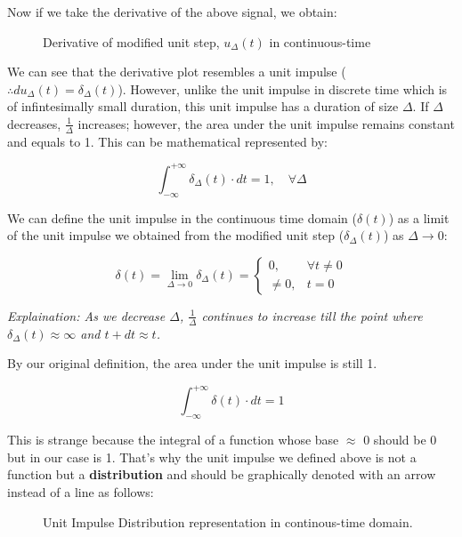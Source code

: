 \documentclass[letterpaper,12pt]{article}
\begin{document}
Now if we take the derivative of the above signal, we obtain:
\begin{figure}[!ht]
    \centering
    
    \caption{Derivative of modified unit step, $u_{\Delta}(t)$ in continuous-time}\label{fig:derivative_unit_step_cont}
\end{figure}

We can see that the derivative plot resembles a unit impulse ($\therefore
    du_{\Delta}(t) = \delta_{\Delta}(t)$). However, unlike the unit impulse in
discrete time which is of infintesimally small duration, this unit impulse has
a duration of size $\Delta$. If $\Delta$ decreases, $\frac{1}{\Delta}$
increases; however, the area under the unit impulse remains constant and equals
to 1. This can be mathematical represented by:

\[\int_{-\infty}^{+\infty}\delta_{\Delta}(t)\cdot dt = 1, \quad \forall \Delta\]

We can define the unit impulse in the continuous time domain ($\delta(t)$) as a
limit of the unit impulse we obtained from the modified unit step
($\delta_{\Delta}(t)$) as $\Delta \to 0$:

\[\delta(t) = \lim_{\Delta \to 0} \delta_{\Delta}(t) = \begin{cases}
        0,      & \forall t \neq 0 \\
        \neq 0, & t = 0
    \end{cases}\]

\textit{Explaination: As we decrease $\Delta$, $\frac{1}{\Delta}$ continues to increase till the point where $\delta_{\Delta}(t) \approx \infty$ and $t + dt \approx t$.}

By our original definition, the area under the unit impulse is still 1.

\[\int_{-\infty}^{+\infty}\delta(t)\cdot dt = 1\]

This is strange because the integral of a function whose base $\approx$ 0
should be 0 but in our case is 1. That's why the unit impulse we defined above
is not a function but a \textbf{distribution} and should be graphically denoted
with an arrow instead of a line as follows:

\begin{figure}[!ht]
    \centering
    
    \caption{Unit Impulse Distribution representation in continous-time domain.}\label{fig:unit_step_distribution}
\end{figure}
\end{document}

